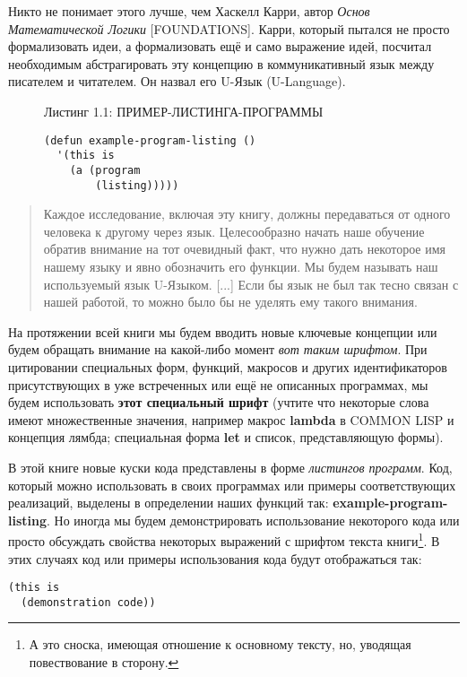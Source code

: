 Никто не понимает этого лучше, чем Хаскелл Карри, автор \emph{Основ Математической Логики} [FOUNDATIONS]. Карри, который пытался не просто формализовать идеи, а формализовать ещё и само выражение идей, посчитал необходимым абстрагировать эту концепцию в ком\-му\-ни\-ка\-тив\-ный язык между писателем и читателем. Он назвал его U-Язык (U-Language).

\begin{figure}Листинг 1.1: ПРИМЕР-ЛИСТИНГА-ПРОГРАММЫ\label{listing_1.1}
\listbegin
\begin{verbatim}
(defun example-program-listing ()
  '(this is
    (a (program
        (listing)))))
\end{verbatim}
\listend
\end{figure}

\begin{quote}
Каждое исследование, включая эту книгу, должны пе\-ре\-да\-ва\-ться от одного человека к другому через язык. Целесообразно начать наше обучение обратив внимание на тот очевидный факт, что нужно дать некоторое имя нашему языку и явно обозначить его функции. Мы будем называть наш ис\-поль\-зуемый язык U-Языком. [...] Если бы язык не был так тесно связан с нашей работой, то можно было бы не уделять ему такого внимания.
\end{quote}

На протяжении всей книги мы будем вводить новые ключевые кон\-цеп\-ции или будем обращать внимание на какой-либо момент \emph{вот таким шриф\-том}. При цитировании специальных форм, функций, макросов и других иден\-тификаторов присутствующих в уже встреченных или ещё не опи\-сан\-ных программах, мы будем использовать \textbf{этот спе\-циаль\-ный шри\-фт} (уч\-тите что некоторые слова имеют множественные значения, на\-при\-мер мак\-рос \textbf{lambda} в COMMON LISP и концепция лямбда; спе\-циаль\-ная форма \textbf{let} и список, представляющую формы).

В этой книге новые куски кода представлены в форме \emph{листингов программ}. Код, который можно использовать в своих программах или примеры соответствующих реализаций, выделены в определении наших функций так: \textbf{example-program-listing}. Но иногда мы будем демонстрировать использование некоторого кода или просто обсуждать свойства некоторых выражений с шрифтом текста книги\footnote{А это сноска, имеющая отношение к основному тексту, но, уводящая повествование в сторону.}. В этих случаях код или примеры использования кода будут отображаться так:

\begin{verbatim}
(this is
  (demonstration code))
\end{verbatim}

